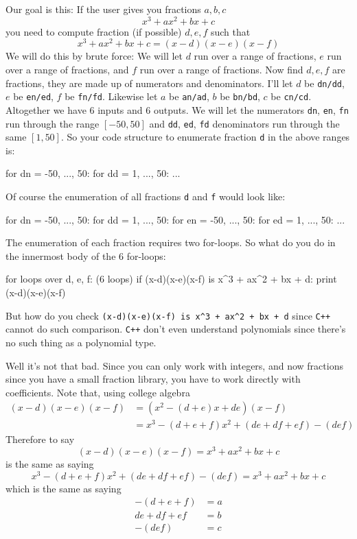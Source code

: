 Our goal is this: If the user gives you fractions $a,b,c$
\[
  x^3 + ax^2 + bx + c
\]
you need to compute fraction (if possible) $d,e,f$ such that
\[
  x^3 + ax^2 + bx + c = (x - d)(x - e)(x - f)
\]
We will do this by brute force:
We will let $d$ run over a range of fractions, $e$ run over a range of fractions,
and $f$ run over a range of fractions.
Now find $d,e,f$ are fractions, they are made up of numerators and denominators.
I'll let
$d$ be \verb!dn/dd!,
$e$ be \verb!en/ed!,
$f$ be \verb!fn/fd!.
Likewise let 
$a$ be \verb!an/ad!,
$b$ be \verb!bn/bd!,
$c$ be \verb!cn/cd!.
Altogether we have 6 inputs and 6 outputs.
We will let the numerators
\verb!dn!,
\verb!en!,
\verb!fn!
run through the range $[-50, 50]$ and
\verb!dd!,
\verb!ed!,
\verb!fd!
denominators run through the same $[1, 50]$.
So your code structure to enumerate fraction \verb!d! in the above ranges is:
\begin{console}
for dn = -50, ..., 50:
    for dd = 1, ..., 50:
        ... 
\end{console}
Of course the enumeration of all fractions \verb!d! and \verb!f! would look like:      
\begin{console}
for dn = -50, ..., 50:
    for dd = 1, ..., 50:
        for en = -50, ..., 50:
            for ed = 1, ..., 50:
                ... 
\end{console}
The enumeration of each fraction requires two for-loops.
So what do you do in the innermost body of the 6 for-loops:
\begin{console}
for loops over d, e, f: (6 loops)
         if (x-d)(x-e)(x-f) is x^3 + ax^2 + bx + d:
             print (x-d)(x-e)(x-f)
\end{console}
But how do you check
\verb!(x-d)(x-e)(x-f) is x^3 + ax^2 + bx + d! since \texttt{C++}
cannot do such comparison.
\texttt{C++}
don't even understand polynomials since there's no such thing as a polynomial type.

Well it's not that bad.
Since you can only work with integers, and now fractions since you have a small fraction
library, you have to work directly with coefficients.
Note that, using college algebra
\begin{align*}
  (x-d)(x-e)(x-f)
  &= (x^2 - (d + e) x + de)(x - f) \\
  &= x^3 - (d + e + f) x^2 + (de + df + ef) - (def)
\end{align*}
Therefore to say
\[
  (x-d)(x-e)(x-f) = x^3 + ax^2 + bx + c
\]
is the same as saying
\[
  x^3 - (d + e + f) x^2 + (de + df + ef) - (def) = x^3 + ax^2 + bx + c
\]
which is the same as saying
\begin{align*}
  -(d + e + f) &= a \\
  de + df + ef &= b \\
  - (def) &=  c
\end{align*}

